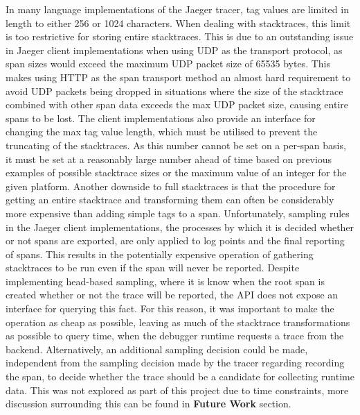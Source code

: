 \documentclass[12pt,pdftex,titlepage]{report}
\begin{document}
                In many language implementations of the Jaeger tracer, tag values are limited in length to either 256 or 1024 characters. When dealing with stacktraces, this limit is too 
                restrictive for storing entire stacktraces. This is due to an outstanding issue in Jaeger client implementations when using UDP as the transport protocol, as span sizes
                would exceed the maximum UDP packet size of 65535 bytes\cite{udptagsize}. This makes using HTTP as the span transport method an almost hard requirement to avoid UDP packets being
                dropped in situations where the size of the stacktrace combined with other span data exceeds the max UDP packet size, causing entire spans to be lost. The client implementations also
                provide an interface for changing the max tag value length, which must be utilised to prevent the truncating of the stacktraces. As this number cannot be set on a per-span basis, 
                it must be set at a reasonably large number ahead of time based on previous examples of possible stacktrace sizes or the maximum value of an integer for the given platform. Another 
                downside to full stacktraces is that the procedure for getting an entire stacktrace and transforming them can often be considerably more expensive than adding simple tags to a span. 
                Unfortunately, sampling rules in the Jaeger client implementations, the processes by which it is decided whether or not spans are exported, are only applied to log points and the final 
                reporting of spans. This results in the potentially expensive operation of gathering stacktraces to be run even if the span will never be reported. Despite implementing head-based sampling, 
                where it is know when the root span is created whether or not the trace will be reported, the API does not expose an interface for querying this fact. For this reason, it was important to 
                make the operation as cheap as possible, leaving as much of the stacktrace transformations as possible to query time, when the debugger runtime requests a trace from the backend. Alternatively,
                an additional sampling decision could be made, independent from the sampling decision made by the tracer regarding recording the span, to decide whether the trace should be a candidate for
                collecting runtime data. This was not explored as part of this project due to time constraints, more discussion surrounding this can be found in \textbf{Future Work} section.
\end{document}

